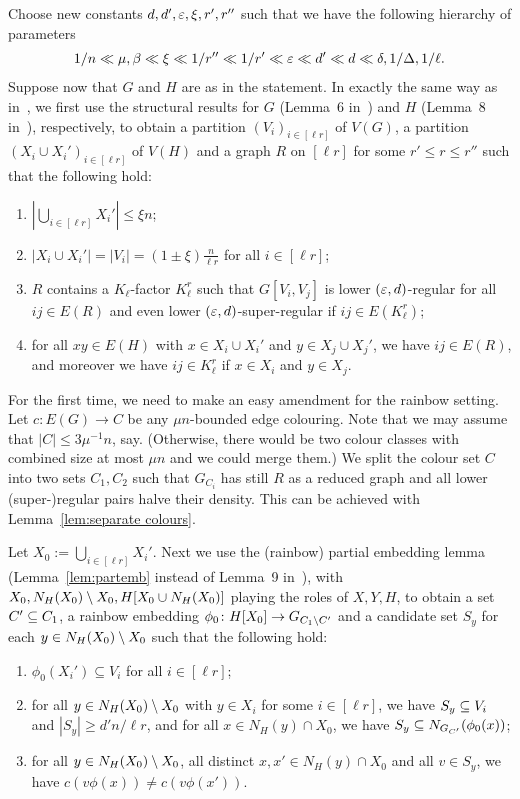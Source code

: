 \documentclass[10pt]{amsart}
\theoremstyle{definition}
\theoremstyle{claimstyle}
\theoremstyle{stepstyle}
\numberwithin{equation}{section}
\def\lateproof#1{\removelastskip\penalty55\medskip\noindent\setcounter{claim}{0}\setcounter{step}{0}{\bf Proof of #1. }} %
\begin{document}
\lateproof{Theorem~\ref{thm:bandwidth}}
Choose new constants $d,d',{\varepsilon},\xi,r',r''$ such that we have the following hierarchy of parameters
\begin{align*}
	1/n\ll \mu , \beta \ll \xi \ll 1/r'' \ll 1/r' \ll {\varepsilon} \ll d'\ll d \ll \delta, 1/\Delta, 1/\ell.
\end{align*}
Suppose now that $G$ and $H$ are as in the statement. In exactly the same way as in~\cite{BST:09}, we first use the structural results for $G$ (Lemma~6 in~\cite{BST:09}) and $H$ (Lemma~8 in~\cite{BST:09}), respectively,
to obtain a partition $(V_i)_{i\in [\ell r]}$ of $V(G)$, a partition $(X_i\cup X_i')_{i\in [\ell r]}$ of $V(H)$ and a graph $R$ on $[\ell r]$ for some $r'\leq r\leq r''$ such that the following hold:
\begin{enumerate}[label=(\roman*)]
	\item $|\bigcup_{i\in [\ell r]}X_i'|\leq \xi n$;
	\item $|X_i\cup X_i'|= |V_i|= (1\pm \xi)\frac{n}{\ell r}$ for all $i\in [\ell r]$;
	\item $R$ contains a $K_\ell$-factor $K^r_\ell$ such that $G[V_i,V_j]$ is lower $({\varepsilon},d)$-regular for all $ij\in E(R)$ and even lower $({\varepsilon},d)$-super-regular if $ij\in E(K^r_\ell)$;
	\item for all $xy\in E(H)$ with $x\in X_i\cup X_i'$ and $y\in X_j\cup X_j'$, 
	we have $ij\in E(R)$, 
	and moreover we have $ij\in K_\ell^r$ if $x\in X_i$ and $y\in X_j$.
\end{enumerate}


For the first time, we need to make an easy amendment for the rainbow setting. Let $c\colon E(G) \to C$ be any $\mu n$-bounded edge colouring. Note that we may assume that $|C|\le 3\mu^{-1}n$, say. (Otherwise, there would be two colour classes with combined size at most $\mu n$ and we could merge them.)
We split the colour set $C$ into two sets $C_1,C_2$ such that $G_{C_i}$ has still $R$ as a reduced graph
and all lower (super-)regular pairs halve their density.
This can be achieved with Lemma~\ref{lem:separate colours}.

Let $X_0:=\bigcup_{i\in [\ell r]}X_i'$.
Next we use the (rainbow) partial embedding lemma (Lemma~\ref{lem:partemb} instead of Lemma~9 in~\cite{BST:09}), with $X_0,N_H(X_0)\setminus X_0,H[X_0\cup N_H(X_0)]$ playing the roles of $X,Y,H$, to obtain a set $C'\subseteq C_1$, a rainbow embedding $\phi_0\colon H[X_0] \to G_{C_1\setminus C'}$ and a candidate set $S_y$ for each $y\in N_H(X_0)\setminus X_0$ such that the following hold:
\begin{enumerate}[label={\rm (\alph*)}]
\item $\phi_0(X_i')\subseteq V_i$ for all $i\in [\ell r]$; \label{partial embedding location}
\item for all $y\in N_H(X_0)\setminus X_0$ with $y\in X_i$ for some $i\in[\ell r]$, we have $S_y\subseteq V_i$ and $|S_y|\geq d' n/\ell r$, and for all $x\in N_H(y)\cap X_0$, we have $S_y\subseteq N_{G_{C'}}(\phi_0(x))$; \label{partial embedding candidates}
\item for all $y\in N_H(X_0)\setminus X_0$, all distinct $x,x'\in N_H(y)\cap X_0$ and all $v\in S_y$, we have $c(v\phi(x))\neq c(v\phi(x'))$. \label{partial embedding rainbow}
\end{enumerate}
\end{document}
